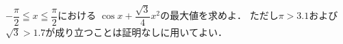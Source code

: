 \documentclass[../../main.tex]{subfiles}
\begin{document}
$\displaystyle -\dfrac{\pi}{2}\leqq x \leqq\dfrac{\pi}{2}$における
$\displaystyle\cos x+\dfrac{\sqrt3}{4}x^2$の最大値を求めよ．
ただし$\pi>3.1$および$\sqrt3>1.7$が成り立つことは証明なしに用いてよい．
\end{document}
